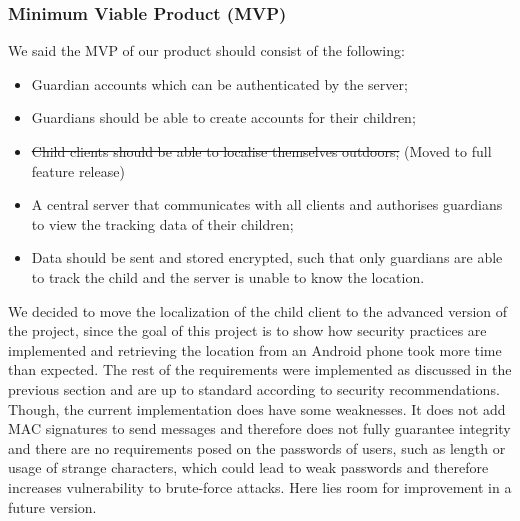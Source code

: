 \documentclass[a4paper]{article}
\begin{document}
\subsubsection{Minimum Viable Product (MVP)}
We said the MVP of our product should consist of the following:
\begin{itemize}
    \item Guardian accounts which can be authenticated by the server;
    \item Guardians should be able to create accounts for their children;
    \item \sout{Child clients should be able to localise themselves outdoors;} (Moved to full feature release)
    \item A central server that communicates with all clients and authorises guardians to view the tracking data of their children;
    \item Data should be sent and stored encrypted, such that only guardians are able to track the child and the server is unable to know the location.
\end{itemize}
We decided to move the localization of the child client to the advanced version of the project, since the goal of this project is to show how security practices are implemented and retrieving the location from an Android phone took more time than expected. The rest of the requirements were implemented as discussed in the previous section and are up to standard according to security recommendations. Though, the current implementation does have some weaknesses. It does not add MAC signatures to send messages and therefore does not fully guarantee integrity and there are no requirements posed on the passwords of users, such as length or usage of strange characters, which could lead to weak passwords and therefore increases vulnerability to brute-force attacks. Here lies room for improvement in a future version. 
\end{document}

